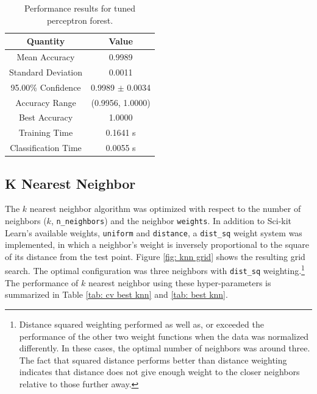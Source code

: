 \documentclass[paper=a4, fontsize=11pt]{scrartcl} %
\begin{document}
\begin{table}[H]
	\centering
	\caption{Performance results for tuned perceptron forest.}
	\begin{tabular}{|c|c|}
		\hline
		\textbf{Quantity}    & \textbf{Value}       \\ \hline \hline
		Mean Accuracy        & 0.9989 \\ \hline
		Standard Deviation   & 0.0011 \\ \hline
		95.00\% Confidence   & 0.9989 $\pm$ 0.0034 \\ \hline
		Accuracy Range       & (0.9956, 1.0000) \\ \hline
		Best Accuracy        & 1.0000 \\ \hline
		Training Time        & 0.1641 s\\ \hline
		Classification Time  & 0.0055 s \\ \hline
	\end{tabular}
	\label{tab: best perceptron forest}
\end{table}

\subsection*{K Nearest Neighbor}
The $k$ nearest neighbor algorithm was optimized with respect to the number of neighbors ($k$, \verb|n_neighbors|) and the neighbor \verb|weights|.
In addition to Sci-kit Learn's available weights, \verb|uniform| and \verb|distance|, a \verb|dist_sq| weight system was implemented, in which a neighbor's weight is inversely proportional to the square of its distance from the test point.
Figure \ref{fig: knn grid} shows the resulting grid search.
The optimal configuration was three neighbors with \verb|dist_sq| weighting.\footnote{Distance squared weighting performed as well as, or exceeded the performance of the other two weight functions when the data was normalized differently.
	In these cases, the optimal number of neighbors was around three. The fact that squared distance performs better than distance weighting indicates that distance does not give enough weight to the closer neighbors relative to those further away.}
The performance of $k$ nearest neighbor using these hyper-parameters is summarized in Table \ref{tab: cv best knn} and \ref{tab: best knn}.
\end{document}
